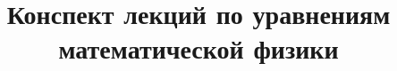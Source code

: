 \documentclass[12pt, a4paper]{report}
\theoremstyle{definition}
\theoremstyle{remark}
\begin{document}
\title{Конспект лекций по уравнениям математической физики}
\maketitle




\end{document}
